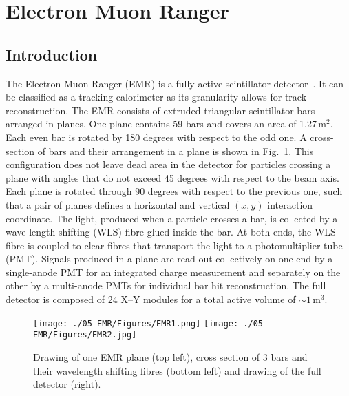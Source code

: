 \graphicspath{{05-EMR/Figures/}}

\section{Electron Muon Ranger}
\label{Sect:EMR}

\subsection{Introduction}
\label{SubSect:EMR_Intro}

The Electron-Muon Ranger (EMR) is a fully-active scintillator detector~\cite{2016JInst..11T10007}. It can be classified as a tracking-calorimeter as its granularity allows for track reconstruction. The EMR consists of extruded triangular scintillator bars arranged in planes. One plane contains 59 bars and covers an area of 1.27\,m$^2$. Each even bar is rotated by 180 degrees with respect to the odd one. A cross-section of bars and their arrangement in a plane is shown in Fig.~\ref{fig:EMR}. This configuration does not leave dead area in the detector for particles crossing a plane with angles that do not exceed 45 degrees with respect to the beam axis. Each plane is rotated through 90 degrees with respect to the previous one, such that a pair of planes defines a horizontal and vertical $(x, y)$ interaction coordinate. The light, produced when a particle crosses a bar, is collected by a wave-length shifting (WLS) fibre glued inside the bar. At both ends, the WLS fibre is coupled to clear fibres that transport the light to a photomultiplier tube (PMT). Signals produced in a plane are read out collectively on one end by a single-anode PMT for an integrated charge measurement and separately on the other by a multi-anode PMTs for individual bar hit reconstruction. The full detector is composed of 24 X--Y modules for a total active volume of $\sim 1$\,m$^3$.

\begin{figure}
	\begin{center}
		\texttt{[image: ./05-EMR/Figures/EMR1.png]}
		\hfill
		\texttt{[image: ./05-EMR/Figures/EMR2.jpg]}
		\caption{Drawing of one EMR plane (top left), cross section of 3 bars and their wavelength shifting fibres (bottom left) and drawing of the full detector (right).}
		\label{fig:EMR}
	\end{center}
\end{figure}

